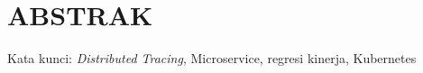 \clearpage
\chapter*{ABSTRAK}




\vspace{15mm}
Kata kunci: \textit{Distributed Tracing}, Microservice, regresi kinerja, Kubernetes
\clearpage